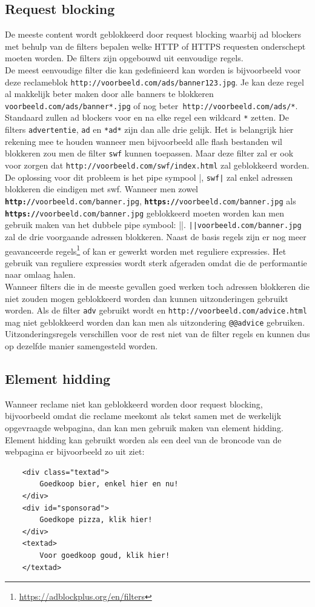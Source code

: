 \documentclass[pdftex,a4paper,12pt,twoside]{report}
\begin{document}
\subsection{Request blocking}
\label{sec:Request blocking}
De meeste content wordt geblokkeerd door request blocking waarbij ad blockers met behulp van de filters bepalen welke HTTP of HTTPS requesten onderschept moeten worden. De filters zijn opgebouwd uit eenvoudige regels.
\\
De meest eenvoudige filter die kan gedefinieerd kan worden is bijvoorbeeld voor deze reclameblok \texttt{http://voorbeeld.com/ads/banner123.jpg}. Je kan deze regel al makkelijk beter maken door alle banners te blokkeren \texttt{voorbeeld.com/ads/banner*.jpg} of nog beter\texttt{ http://voorbeeld.com/ads/*}. Standaard zullen ad blockers voor en na elke regel een wildcard \texttt{*} zetten. De filters \texttt{advertentie}, \texttt{ad} en \texttt{*ad*} zijn dan alle drie gelijk. Het is belangrijk hier rekening mee te houden wanneer men bijvoorbeeld alle flash bestanden wil blokkeren zou men de filter \texttt{swf} kunnen toepassen. Maar deze filter zal er ook voor zorgen dat \texttt{http://voorbeeld.com/swf/index.html} zal geblokkeerd worden. De oplossing voor dit probleem is het pipe sympool |, \texttt{swf|} zal enkel adressen blokkeren die eindigen met swf. Wanneer men zowel \texttt{\textbf{http://}voorbeeld.com/banner.jpg}, \texttt{\textbf{https://}voorbeeld.com/banner.jpg} als \texttt{\textbf{https://}voorbeeld.com/banner.jpg} geblokkeerd moeten worden kan men gebruik maken van het dubbele pipe symbool: ||. \texttt{||voorbeeld.com/banner.jpg} zal de drie voorgaande adressen blokkeren.
Naast de basis regels zijn er nog meer geavanceerde regels\footnote{\url{https://adblockplus.org/en/filters}} of kan er gewerkt worden met reguliere expressies. Het gebruik van reguliere expressies wordt sterk afgeraden omdat die de performantie naar omlaag halen.
\\
Wanneer filters die in de meeste gevallen goed werken toch adressen blokkeren die niet zouden mogen geblokkeerd worden dan kunnen uitzonderingen gebruikt worden. Als de filter \texttt{adv} gebruikt wordt en \texttt{http://voorbeeld.com/advice.html} mag niet geblokkeerd worden dan kan men als uitzondering \texttt{@@advice} gebruiken. Uitzonderingsregels verschillen voor de rest niet van de filter regels en kunnen dus op dezelfde manier samengesteld worden.
\subsection{ Element hidding}
\label{sec:Element hidding}
Wanneer reclame niet kan geblokkeerd worden door request blocking, bijvoorbeeld omdat die reclame meekomt als tekst samen met de werkelijk opgevraagde webpagina, dan kan men gebruik maken van element hidding. Element hidding kan gebruikt worden als een deel van de broncode van de webpagina er bijvoorbeeld zo uit ziet:
\lstset{language=Html,tabsize=2}  
\begin{lstlisting}
	<div class="textad">
		Goedkoop bier, enkel hier en nu!
	</div>
	<div id="sponsorad">
		Goedkope pizza, klik hier!
	</div>
	<textad>
		Voor goedkoop goud, klik hier!
	</textad>
\end{lstlisting}
\end{document}
